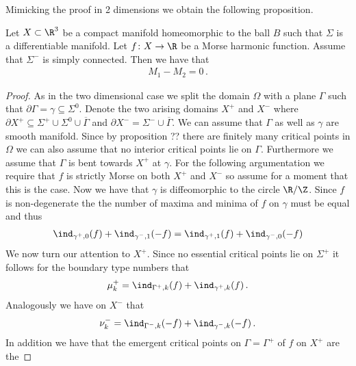 Mimicking the proof in 2 dimensions we obtain the following proposition.
\begin{proposition}
  Let $X\subset\R^3$ be a compact manifold homeomorphic to the ball $B$ such that $\Sigma$ is a differentiable manifold.
  Let $f\colon X\to\R$ be a Morse harmonic function. Assume that $\Sigma^-$ is simply connected.
  Then we have that
  \begin{align*}
    M_1-M_2=0\,.
  \end{align*}
\end{proposition}
\begin{proof}
  As in the two dimensional case we split the domain $\Omega$ with a plane $\Gamma$ such that
  $\partial\Gamma=\gamma\subseteq\Sigma^0$.
  Denote the two arising domains $X^+$ and $X^-$ where $\partial X^+\subseteq\Sigma^+\cup\Sigma^0\cup\overline{\Gamma}$ and
  $\partial X^-=\Sigma^-\cup\overline{\Gamma}$.
  We can assume that $\Gamma$ as well as $\gamma$ are smooth manifold.
  Since by proposition ?? there are finitely many critical points in $\Omega$
  we can also assume that no interior critical points lie on $\Gamma$.
  Furthermore we assume that $\Gamma$ is bent towards $X^+$ at $\gamma$.
  For the following argumentation we require that $f$ is strictly Morse on both $X^+$ and
  $X^-$ so assume for a moment that this is the case.
  Now we have that $\gamma$ is diffeomorphic to the circle $\R/\Z$.
  Since $f$ is non-degenerate the
  the number of maxima and minima of $f$ on $\gamma$ must be equal and thus
  \begin{align}
    \ind_{\gamma^+,0}(f)+\ind_{\gamma^-,1}(-f)=\ind_{\gamma^+,1}(f)+\ind_{\gamma^-,0}(-f)
    \label{eq:n3_disproof_morse_maxMinRel}
  \end{align}
  We now turn our attention to $X^+$. Since no essential critical points lie on $\Sigma^+$ 
  it follows for the boundary type numbers that
  \begin{align}
    \mu^+_k=\ind_{\Gamma^+,k}(f)+\ind_{\gamma^+,k}(f)\,.\label{eq:n3_disproof_morse_muplus}
  \end{align}
  Analogously we have on $X^-$ that
  \begin{align}
    \nu^-_k=\ind_{\Gamma^-,k}(-f)+\ind_{\gamma^-,k}(-f)\,.\label{eq:n3_disproof_morse_numinus}
  \end{align}
  In addition we have that the emergent critical points on $\Gamma=\Gamma^+$ of $f$ on $X^+$ are the

\end{proof}
